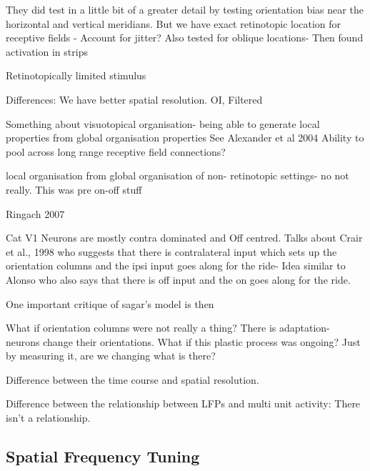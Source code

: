 They did test in a little bit of a greater detail by testing orientation bias near the horizontal and vertical meridians. But we have exact retinotopic location for receptive fields - Account for jitter?
Also tested for oblique locations- Then found activation in strips

Retinotopically limited stimulus

Differences: We have better spatial resolution. OI, Filtered

	Something about visuotopical organisation- being able to generate local properties from global organisation properties See Alexander et al 2004
	Ability to pool across long range receptive field connections?
	
	local organisation from global organisation of non- retinotopic settings- no not really. This was pre on-off stuff
	
Ringach 2007

Cat V1 Neurons are mostly contra dominated and Off centred.
Talks about Crair et al., 1998 who suggests that there is contralateral input which sets up the orientation columns and the ipsi input goes along for the ride- Idea similar to Alonso who also says that there is off input and the on goes along for the ride.

One important critique of sagar's model is then

What if orientation columns were not really a thing? There is adaptation- neurons change their orientations. What if this plastic process was ongoing? Just by measuring it, are we changing what is there?



Difference between the time course and spatial resolution.

Difference between the relationship between LFPs and multi unit activity: There isn't a relationship.



\subsection{Spatial Frequency Tuning}





